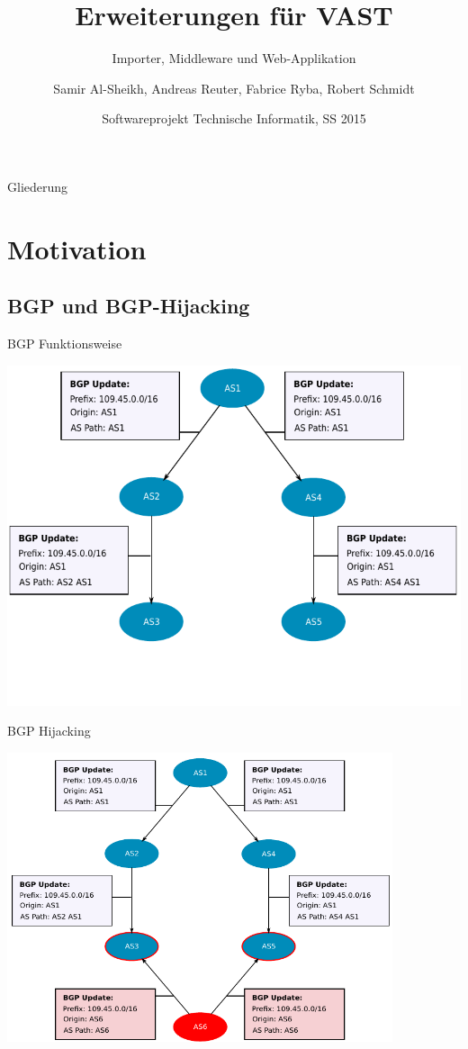 \documentclass[9pt]{beamer}
\title{Erweiterungen für VAST}
\subtitle{Importer, Middleware und Web-Applikation}
\author{Samir Al-Sheikh, Andreas Reuter, Fabrice Ryba, Robert Schmidt}
\institute[FU Berlin]{Freie Universität Berlin}
\date[]{Softwareprojekt Technische Informatik, SS 2015}
\begin{document}
\begin{frame}
    \titlepage
\end{frame}

\begin{frame}{Gliederung}
  \tableofcontents
\end{frame}


\section{Motivation}

\subsection{BGP und BGP-Hijacking}

\begin{frame}{BGP Funktionsweise}{}
	\begin{center}
		\includegraphics[width=1.0\textwidth]{res/bgp_propagation.pdf}
	\end{center}
\end{frame}

\begin{frame}{BGP Hijacking}{}
	\begin{center}
		\includegraphics[width=0.85\textwidth]{res/prefix_hijack.pdf}
	\end{center}
\end{frame}
\end{document}
